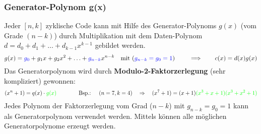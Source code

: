 \subsubsection{Generator-Polynom g(x) }
Jeder $[n,k]$ zyklische Code kann mit Hilfe des Generator-Polynoms $g(x)$ (vom Grade $(n-k)$)
durch Multiplikation mit dem Daten-Polynom $d=d_0 + d_1 + \ldots + d_{k-1}x^{k-1}$ gebildet werden.
$$ g(x) = \textcolor{blue}{g_0} + g_1 x + g_2 x^2 + \ldots + \textcolor{blue}{g_{n-k}} x^{n-k}
\quad \text{mit (} \textcolor{blue}{g_{n-k} = g_0 = 1} \text{) } \qquad \Longrightarrow \qquad
c(x) = d(x) g(x)$$
Das Generatorpolynom wird durch \textbf{Modulo-2-Faktorzerlegung} (sehr kompliziert) gewonnen: 
$$ (x^n + 1) = q(x) \cdot \textcolor{green}{g(x)} \qquad \qquad \text{Bsp.: } \quad (n=7,k=4) \quad
\Rightarrow \quad (x^7 + 1) = (x+1)\textcolor{green}{(x^3+x+1)(x^3+x^2+1)}$$ Jedes Polynom der
Faktorzerlegung vom Grad ($n-k$) mit $g_{n-k} = g_0 = 1$ kann als Generatorpolynom verwendet
werden. Mittels \textbf{} können alle möglichen Generatorpolynome
erzeugt werden.


